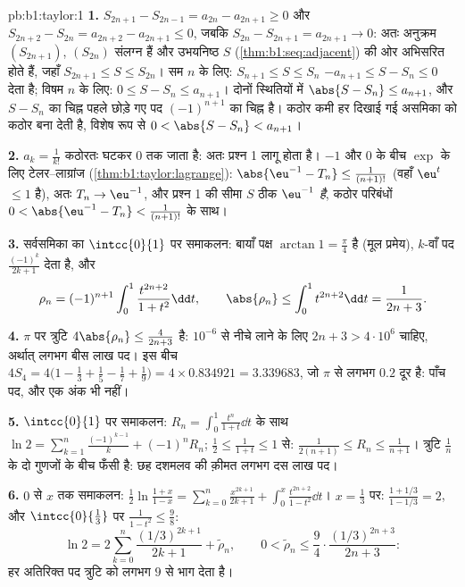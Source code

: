 \begin{solution}{pb:b1:taylor:1}
\textbf{1.} $S_{2n+1} - S_{2n-1} = a_{2n} - a_{2n+1} \geq 0$ और $S_{2n+2} -
S_{2n} = a_{2n+2} - a_{2n+1} \leq 0$, जबकि $S_{2n} - S_{2n+1} = a_{2n+1} \to
0$: अतः अनुक्रम $(S_{2n+1})$, $(S_{2n})$ संलग्न हैं और उभयनिष्ठ $S$
(\cref{thm:b1:seq:adjacent}) की ओर अभिसरित होते हैं, जहाँ $S_{2n+1} \leq S
\leq S_{2n}$। सम $n$ के लिए: $S_{n+1} \leq S \leq S_n$ $-a_{n+1} \leq S -
S_n \leq 0$ देता है; विषम $n$ के लिए: $0 \leq S - S_n \leq a_{n+1}$। दोनों
स्थितियों में $\abs{S - S_n} \leq a_{n+1}$, और $S - S_n$ का चिह्न पहले छोड़े
गए पद $(-1)^{n+1}$ का चिह्न है। कठोर कमी हर दिखाई गई असमिका को कठोर बना देती
है, विशेष रूप से $0 < \abs{S - S_n} < a_{n+1}$।

\textbf{2.} $a_k = \frac{1}{k!}$ कठोरतः घटकर $0$ तक जाता है: अतः प्रश्न 1
लागू होता है। $-1$ और $0$ के बीच $\exp$ के लिए टेलर--लाग्रांज
(\cref{thm:b1:taylor:lagrange}): $\abs{\eu^{-1} - T_n} \leq
\frac{1}{(n+1)!}$ (वहाँ  $\eu^t$ $\leq 1$ है), अतः $T_n \to \eu^{-1}$,
और प्रश्न 1 की सीमा $S$ ठीक $\eu^{-1}$ \emph{है}, कठोर परिबंधों $0 <
\abs{\eu^{-1} - T_n} < \frac{1}{(n+1)!}$ के साथ।

\textbf{3.} सर्वसमिका का $\intcc{0}{1}$ पर समाकलन: बायाँ पक्ष $\arctan 1 =
\frac\pi4$ है (मूल प्रमेय), $k$-वाँ पद $\frac{(-1)^k}{2k+1}$ देता है, और
\[
\rho_n = (-1)^{n+1}\int_0^1 \frac{t^{2n+2}}{1+t^2}\dd t,
\qquad
\abs{\rho_n} \leq \int_0^1 t^{2n+2}\dd t = \frac{1}{2n+3} .
\]

\textbf{4.} $\pi$ पर त्रुटि $4\abs{\rho_n} \leq \frac{4}{2n+3}$ है:
$10^{-6}$ से नीचे लाने के लिए $2n + 3 > 4\cdot10^6$ चाहिए, अर्थात् लगभग बीस
लाख पद। इस बीच $4S_4 = 4\bigl(1 - \frac13 + \frac15 - \frac17 +
\frac19\bigr) = 4 \times 0.834921 = 3.339683$, जो $\pi$ से लगभग $0.2$ दूर
है: पाँच पद, और एक अंक भी नहीं।

\textbf{5.} $\intcc{0}{1}$ पर समाकलन: $R_n = \int_0^1 \frac{t^n}{1+t}\dd t$
के साथ $\ln 2 = \sum_{k=1}^{n} \frac{(-1)^{k-1}}{k} + (-1)^n R_n$; $\frac12
\leq \frac{1}{1+t} \leq 1$ से: $\frac{1}{2(n+1)} \leq R_n \leq
\frac{1}{n+1}$। त्रुटि $\frac1n$ के दो गुणजों के बीच फँसी है: छह दशमलव की
क़ीमत लगभग दस लाख पद।

\textbf{6.} $0$ से $x$ तक समाकलन: $\frac12\ln\frac{1 + x}{1 - x} =
\sum_{k=0}^{n} \frac{x^{2k+1}}{2k+1} + \int_0^x \frac{t^{2n+2}}{1-t^2}\dd
t$। $x = \frac13$ पर: $\frac{1 + 1/3}{1 - 1/3} = 2$, और $\intcc{0}{\frac13}$
पर $\frac{1}{1 - t^2} \leq \frac98$:
\[
\ln 2 = 2\sum_{k=0}^{n} \frac{(1/3)^{2k+1}}{2k+1} +
\tilde\rho_n,
\qquad
0 < \tilde\rho_n \leq \frac{9}{4}\cdot
\frac{(1/3)^{2n+3}}{2n+3} :
\]
हर अतिरिक्त पद त्रुटि को लगभग $9$ से भाग देता है।


\end{solution}
